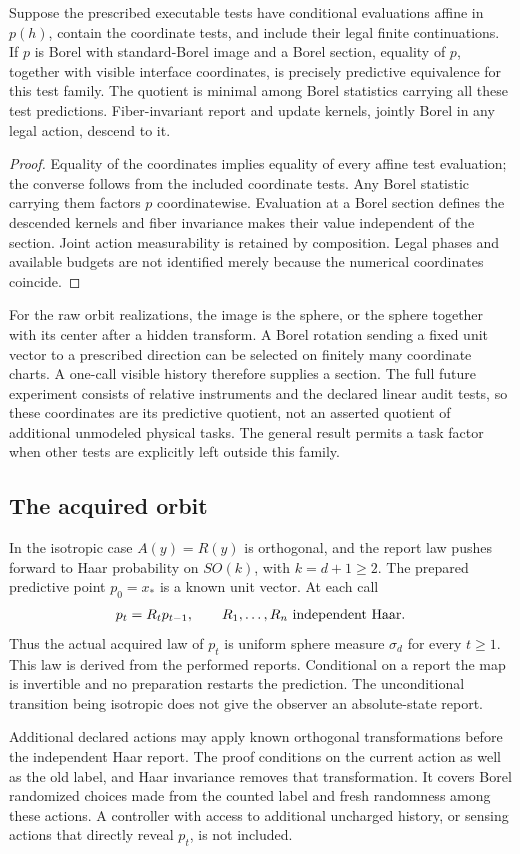 \begin{lemma}\label{lem:quotient-native}
Suppose the prescribed executable tests have conditional evaluations affine in $p(h)$, contain the coordinate tests, and include their legal finite continuations. If $p$ is Borel with standard-Borel image and a Borel section, equality of $p$, together with visible interface coordinates, is precisely predictive equivalence for this test family. The quotient is minimal among Borel statistics carrying all these test predictions. Fiber-invariant report and update kernels, jointly Borel in any legal action, descend to it.
\end{lemma}
\begin{proof}
Equality of the coordinates implies equality of every affine test evaluation; the converse follows from the included coordinate tests. Any Borel statistic carrying them factors $p$ coordinatewise. Evaluation at a Borel section defines the descended kernels and fiber invariance makes their value independent of the section. Joint action measurability is retained by composition. Legal phases and available budgets are not identified merely because the numerical coordinates coincide.
\end{proof}
For the raw orbit realizations, the image is the sphere, or the sphere together with its center after a hidden transform. A Borel rotation sending a fixed unit vector to a prescribed direction can be selected on finitely many coordinate charts. A one-call visible history therefore supplies a section. The full future experiment consists of relative instruments and the declared linear audit tests, so these coordinates are its predictive quotient, not an asserted quotient of additional unmodeled physical tasks. The general result permits a task factor when other tests are explicitly left outside this family.

\subsection{The acquired orbit}
In the isotropic case $A(y)=R(y)$ is orthogonal, and the report law pushes forward to Haar probability on $SO(k)$, with $k=d+1\ge2$. The prepared predictive point $p_0=x_*$ is a known unit vector. At each call
\begin{equation}\label{eq:relative}
 p_t=R_t p_{t-1},\qquad R_1,\ldots,R_n\ \hbox{independent Haar}.
\end{equation}
Thus the actual acquired law of $p_t$ is uniform sphere measure $\sigma_d$ for every $t\ge1$. This law is derived from the performed reports. Conditional on a report the map is invertible and no preparation restarts the prediction. The unconditional transition being isotropic does not give the observer an absolute-state report.

Additional declared actions may apply known orthogonal transformations before the independent Haar report. The proof conditions on the current action as well as the old label, and Haar invariance removes that transformation. It covers Borel randomized choices made from the counted label and fresh randomness among these actions. A controller with access to additional uncharged history, or sensing actions that directly reveal $p_t$, is not included.

